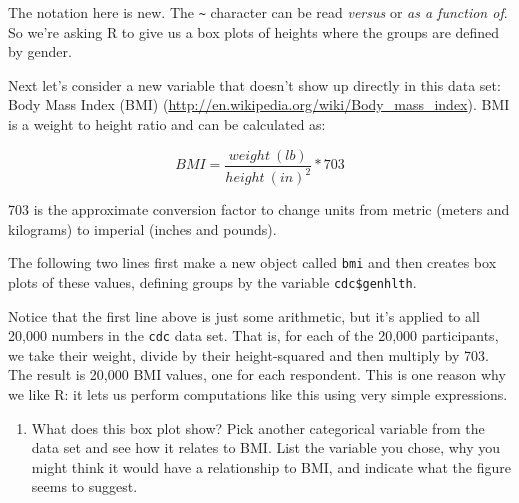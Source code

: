\documentclass[]{article}
\newenvironment{Shaded}{\begin{snugshade}}{\end{snugshade}}
\newcommand{\KeywordTok}[1]{\textcolor[rgb]{0.13,0.29,0.53}{\textbf{{#1}}}}
\newcommand{\DecValTok}[1]{\textcolor[rgb]{0.00,0.00,0.81}{{#1}}}
\newcommand{\StringTok}[1]{\textcolor[rgb]{0.31,0.60,0.02}{{#1}}}
\newcommand{\NormalTok}[1]{{#1}}
\begin{document}
\begin{Shaded}
\end{Shaded}

The notation here is new. The \texttt{\textasciitilde{}} character can
be read \emph{versus} or \emph{as a function of}. So we're asking R to
give us a box plots of heights where the groups are defined by gender.

Next let's consider a new variable that doesn't show up directly in this
data set: Body Mass Index (BMI)
(\href{http://en.wikipedia.org/wiki/Body_mass_index}{\url{http://en.wikipedia.org/wiki/Body_mass_index}}).
BMI is a weight to height ratio and can be calculated as:

\[ BMI = \frac{weight~(lb)}{height~(in)^2} * 703 \]

703 is the approximate conversion factor to change units from metric
(meters and kilograms) to imperial (inches and pounds).

The following two lines first make a new object called \texttt{bmi} and
then creates box plots of these values, defining groups by the variable
\texttt{cdc\$genhlth}.

\begin{Shaded}
\end{Shaded}

Notice that the first line above is just some arithmetic, but it's
applied to all 20,000 numbers in the \texttt{cdc} data set. That is, for
each of the 20,000 participants, we take their weight, divide by their
height-squared and then multiply by 703. The result is 20,000 BMI
values, one for each respondent. This is one reason why we like R: it
lets us perform computations like this using very simple expressions.

\begin{enumerate}
\def\labelenumi{\arabic{enumi}.}
\setcounter{enumi}{3}
\itemsep1pt\parskip0pt
\item
  What does this box plot show? Pick another categorical variable from
  the data set and see how it relates to BMI. List the variable you
  chose, why you might think it would have a relationship to BMI, and
  indicate what the figure seems to suggest.
\end{enumerate}
\end{document}
